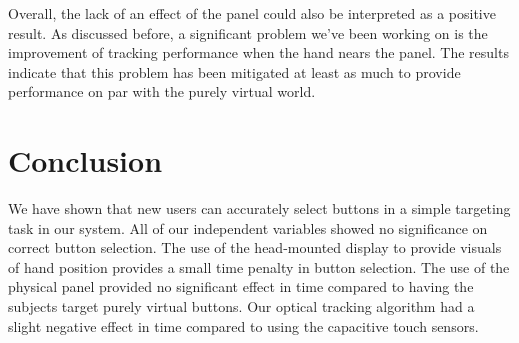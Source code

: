 Overall, the lack of an effect of the panel could also be interpreted as a positive result.
As discussed before, a significant problem we've been working on is the improvement of tracking performance when the hand nears the panel.
The results indicate that this problem has been mitigated at least as much to provide performance on par with the purely virtual world.

\section{Conclusion}


We have shown that new users can accurately select buttons in a simple targeting task in our system.
All of our independent variables showed no significance on correct button selection.
The use of the head-mounted display to provide visuals of hand position provides a small time penalty in button selection.
The use of the physical panel provided no significant effect in time compared to having the subjects target purely virtual buttons.
Our optical tracking algorithm had a slight negative effect in time compared to using the capacitive touch sensors.
